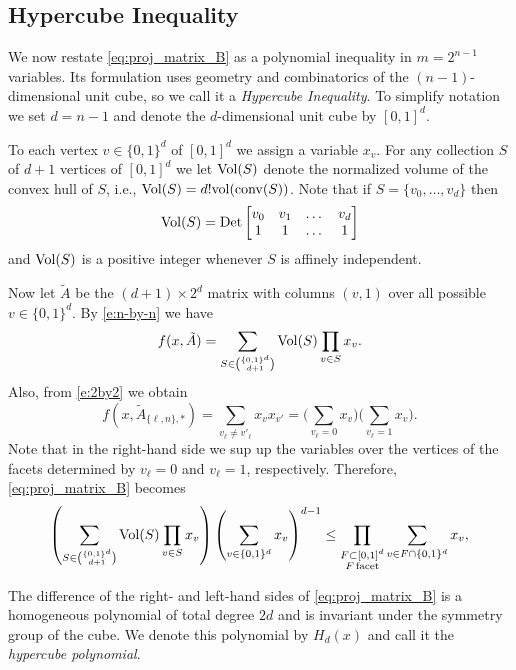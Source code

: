 \documentclass[11pt]{amsart}
\newcommand{\conv}{\mathrm{conv}}
\def\vol{{\rm vol}}
\def\Vol{{\rm Vol}}
\theoremstyle{definition}
\theoremstyle{remark}
\newcommand{\Det}{\operatorname{Det}}
\begin{document}
\subsection{Hypercube Inequality} We now restate \eqref{eq:proj_matrix_B} as a polynomial inequality
in $m=2^{n-1}$ variables. Its formulation uses geometry and combinatorics of the $(n-1)$-dimensional unit cube, so we call it a {\it Hypercube Inequality}. To simplify notation we set $d=n-1$ and denote the $d$-dimensional unit cube by $[0,1]^d$.

To each vertex $v\in\{0,1\}^d$ of $[0,1]^d$ we assign a variable $x_v$. For any collection $S$ of $d+1$ vertices
of $[0,1]^d$ we let $\Vol(S)$ denote the normalized volume of the convex hull of $S$, i.e., $\Vol(S)=d!\vol(\conv(S))$. Note that if $S=\{v_0,\dots, v_d\}$ then 
$$\Vol(S)=\Det\left[
\begin{matrix}v_0 & v_1 & \dots & v_d\\
1 & 1 & \dots & 1
\end{matrix}
\right]$$ 
and $\Vol(S)$ is a positive integer whenever $S$ is affinely independent. 


Now let $\tilde A$ be the $(d+1)\times 2^d$ matrix with columns $(v, 1)$ over all possible $v\in \{0,1\}^d$. By \eqref{e:n-by-n} we have
$$f(x,\tilde A) =\sum_{S \in \binom{\{0,1\}^d}{d+1}} 
            \Vol(S)\prod_{v \in S} x_v.$$
Also, from \eqref{e:2by2} we obtain
$$
f(x,\tilde A_{\{\ell,n\},\ast})=\sum_{v_\ell\neq v'_\ell}x_{v}x_{v'}=\Big(\sum_{v_\ell=0}x_v\Big)\Big(\sum_{v_\ell=1}x_v\Big).
$$
Note that in the right-hand side we sup up the variables over the vertices of the facets determined by $v_\ell=0$ and $v_\ell=1$, respectively.
Therefore, \eqref{eq:proj_matrix_B} becomes
\begin{equation}\label{eq:hypercube_ineq-2}
	\left( 
        \sum_{S \in \binom{\{0,1\}^d}{d+1}} 
            \Vol(S)\prod_{v \in S} x_v
            \right)
        \left( 
        \sum_{v \in \{0,1\}^d} x_v 
    \right)^{d-1}  
    \le 
    \prod_{\substack{F\subset [0,1]^d\\ F\, \text{facet}}} 
    \sum_{v \in F \cap \{0,1\}^d} 
        x_v,
\end{equation}

The difference of the right- and left-hand sides of \eqref{eq:proj_matrix_B} is
a homogeneous polynomial of total degree $2d$ and is invariant under the symmetry group of the cube.
We denote this polynomial by $H_d(x)$ and call it the {\it hypercube polynomial}.
\end{document}
